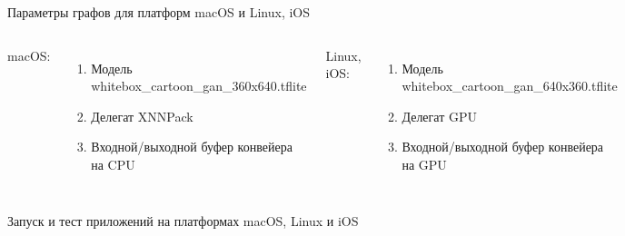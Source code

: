 \documentclass[aspectratio=169,xcolor=dvipsnames]{beamer}
\begin{document}
\begin{frame}{Параметры графов для платформ macOS и Linux, iOS}
    \begin{columns}[c] %

        macOS:
        \begin{enumerate}
            \item Модель whitebox\_cartoon\_gan\_360x640.tflite
            \item Делегат XNNPack
            \item Входной/выходной буфер конвейера на CPU
        \end{enumerate}

        Linux, iOS:
        \begin{enumerate}
            \item Модель whitebox\_cartoon\_gan\_640x360.tflite
            \item Делегат GPU
            \item Входной/выходной буфер конвейера на GPU
        \end{enumerate}
    \end{columns}
\end{frame}


\begin{frame}{Запуск и тест приложений на платформах macOS, Linux и iOS}
    \begin{columns}[] %

        \begin{figure}[h]
            \label{ris:ORTModelData}
        \end{figure}

        \begin{figure}[h]
            \label{ris:ORTModelData}
        \end{figure}
    \end{columns}
\end{frame}
\end{document}
